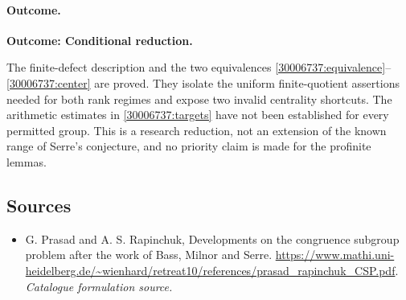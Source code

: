 \documentclass[11pt,a4paper]{article}
\numberwithin{equation}{section}
\begin{document}
\paragraph{Outcome.}
\textbf{Outcome: Conditional reduction.}

The finite-defect description and the two equivalences
\eqref{30006737:equivalence}--\eqref{30006737:center} are proved.  They isolate the
uniform finite-quotient assertions needed for both rank regimes and expose
two invalid centrality shortcuts.  The arithmetic estimates in
\eqref{30006737:targets} have not been established for every permitted group.
This is a research reduction, not an extension of the known range of
Serre's conjecture, and no priority claim is made for the profinite lemmas.
\subsection{Sources}
\begin{itemize}\raggedright
\item[\textnormal{[S1]}]\hypertarget{source:30006737:1}{} G. Prasad and A. S. Rapinchuk, Developments on the congruence subgroup problem after the work of Bass, Milnor and Serre.
\url{https://www.mathi.uni-heidelberg.de/~wienhard/retreat10/references/prasad_rapinchuk_CSP.pdf}.
{\small\textit{Catalogue formulation source.}}
\end{itemize}
\end{document}

